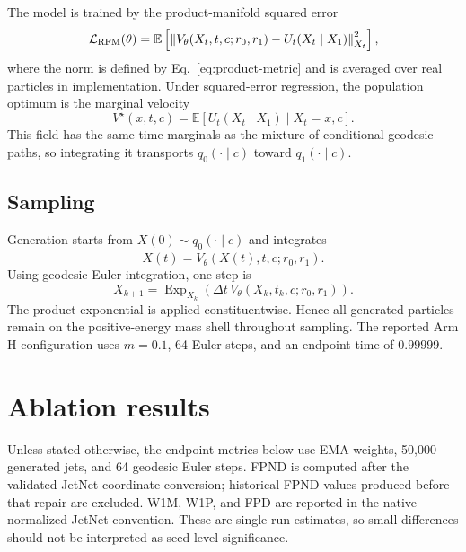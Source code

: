 \documentclass[10pt]{article}
\newcommand{\Exp}{\operatorname{Exp}}
\begin{document}
The model is trained by the product-manifold squared error
\begin{equation}
 \mathcal{L}_{\rm RFM}(\theta)=
 \mathbb{E}\left[
 \left\|V_\theta(X_t,t,c;r_0,r_1)-U_t(X_t\mid X_1)\right\|_{X_t}^2
 \right],
 \label{eq:rfm-loss}
\end{equation}
where the norm is defined by Eq.~\eqref{eq:product-metric} and is averaged over
real particles in implementation. Under squared-error regression, the population
optimum is the marginal velocity
\begin{equation}
 V^\star(x,t,c)=\mathbb{E}[U_t(X_t\mid X_1)\mid X_t=x,c].
 \label{eq:marginal-field}
\end{equation}
This field has the same time marginals as the mixture of conditional geodesic paths,
so integrating it transports $q_0(\cdot\mid c)$ toward $q_1(\cdot\mid c)$.

\subsection{Sampling}

Generation starts from $X(0)\sim q_0(\cdot\mid c)$ and integrates
\begin{equation}
 \dot X(t)=V_\theta(X(t),t,c;r_0,r_1).
 \label{eq:ode}
\end{equation}
Using geodesic Euler integration, one step is
\begin{equation}
 X_{k+1}=\Exp_{X_k}\!\left(\Delta t\,V_\theta(X_k,t_k,c;r_0,r_1)\right).
 \label{eq:euler}
\end{equation}
The product exponential is applied constituentwise. Hence all generated particles
remain on the positive-energy mass shell throughout sampling. The reported Arm H
configuration uses $m=0.1$, 64 Euler steps, and an endpoint time of $0.99999$.

\section{Ablation results}
\label{sec:ablations}

Unless stated otherwise, the endpoint metrics below use EMA weights, 50,000
generated jets, and 64 geodesic Euler steps. FPND is computed after the validated
JetNet coordinate conversion; historical FPND values produced before that repair are
excluded. W1M, W1P, and FPD are reported in the native normalized JetNet convention.
These are single-run estimates, so small differences should not be interpreted as
seed-level significance.
\end{document}
